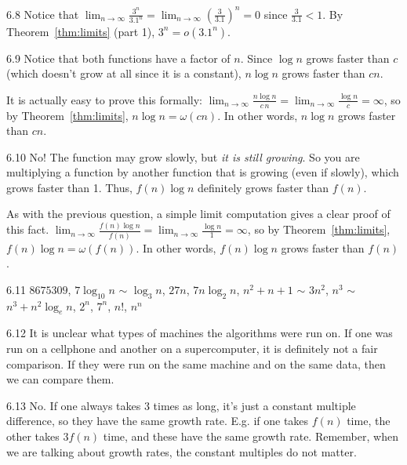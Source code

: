 \begin{RequAnswer}{6.8}
Notice that
$\displaystyle \lim_{n\rightarrow\infty} \frac{3^n}{3.1^n} = \lim_{n\rightarrow\infty} \left(\frac{3}{3.1}\right)^n=0$
since $\frac{3}{3.1}<1$. By Theorem~\ref{thm:limits} (part 1), $3^n=o(3.1^n)$.
\end{RequAnswer}
\begin{RequAnswer}{6.9}
Notice that both functions have a factor of $n$. Since $\log n$ grows faster than $c$ (which doesn't grow at all since
it is a constant), $n\log n$ grows faster than $c n$.

It is actually easy to prove this formally:
$\displaystyle\lim_{n\rightarrow\infty} \frac{n\log n}{c\, n} = \lim_{n\rightarrow\infty} \frac{\log n}{c} =\infty$,
so by Theorem~\ref{thm:limits}, $n\log n=\omega(c n)$. In other words, $n\log n$ grows faster than $c n$.

\end{RequAnswer}
\begin{RequAnswer}{6.10}
No! The function may grow slowly, but {\em it is still growing}.
So you are multiplying a function by another function that is growing (even if slowly), which grows faster than 1.
Thus, $f(n)\log n$ definitely grows faster than $f(n)$.

As with the previous question, a simple limit computation gives a clear proof of this fact.
$\displaystyle\lim_{n\rightarrow\infty} \frac{f(n)\log n}{f(n)} = \lim_{n\rightarrow\infty} \frac{\log n}{1} =\infty$,
so by Theorem~\ref{thm:limits}, $f(n)\log n=\omega(f(n))$. In other words, $f(n)\log n$ grows faster than $f(n)$.

\end{RequAnswer}
\begin{RequAnswer}{6.11}
$8675309$,
$7 \log_{10} n$ $\sim$ $\log_3 n$,
$27 n$,
$7n\log_2 n$,
$n^2+n+1$ $\sim$ $3n^2$,
$n^3$ $\sim$ $n^3+n^2\log_{e} n$,
$2^n$,
$7^n$,
$n!$,
$n^n$
\end{RequAnswer}
\begin{RequAnswer}{6.12}
It is unclear what types of machines the algorithms were run on. If one was run on a cellphone and another
on a supercomputer, it is definitely not a fair comparison.
If they were run on the same machine and on the same data, then we can compare them.
\end{RequAnswer}
\begin{RequAnswer}{6.13}
No. If one always takes 3 times as long, it's just a constant multiple difference, so they have
the same growth rate. E.g. if one takes $f(n)$ time, the other takes $3f(n)$ time, and these
have the same growth rate.
Remember, when we are talking about growth rates, the constant multiples do not matter.
\end{RequAnswer}
